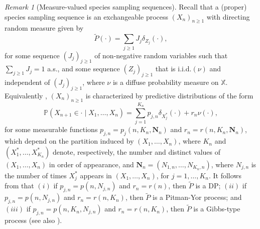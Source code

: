 \documentclass[a4paper]{article}
\theoremstyle{plain}
\theoremstyle{remark}
\newtheorem{remark}[theorem]{Remark}
\theoremstyle{definition}
\begin{document}
\begin{remark}[Measure-valued species sampling sequences]\label{model:mvps:remark_sss}
Recall that a (proper) species sampling sequence \citep[][Definition 12]{pitman1996} is an exchangeable process $(X_n)_{n\geq1}$ with directing random measure given by
\begin{equation}\label{model:mvps:remark_sss:eq1}
\tilde{P}(\cdot)=\sum_{j\geq1}J_j\delta_{Z_j}(\cdot),
\end{equation}
for some sequence $(J_j)_{j\geq1}$ of non-negative random variables such that $\sum_{j\geq1}J_j=1$ a.s., and some sequence $(Z_j)_{j\geq1}$ that is i.i.d.$(\nu)$ and independent of $(J_j)_{j\geq1}$, where $\nu$ is a diffuse probability measure on $\mathbb{X}$. Equivalently \citep{hansen2000}, $(X_n)_{n\geq1}$ is characterized by predictive distributions of the form
\begin{equation}\label{model:mvps:remark_sss:eq2}
\mathbb{P}(X_{n+1}\in\cdot\mid X_1,\ldots,X_n)=\sum_{j=1}^{K_n}p_{j,n}\delta_{X_j^*}(\cdot)+r_n\nu(\cdot),
\end{equation}
for some measurable functions $p_{j,n}=p_j(n,K_n,\textbf{N}_n)$ and $r_n=r(n,K_n,\textbf{N}_n)$, which depend on the partition induced by $(X_1,\ldots,X_n)$, where $K_n$ and $(X_1^*,\ldots,X_{K_n}^*)$ denote, respectively, the number and distinct values of $(X_1,\ldots,X_n)$ in order of appearance, and $\textbf{N}_n=(N_{1,n},\ldots,N_{K_n,n})$, where $N_{j,n}$ is the number of times $X_j^*$ appears in $(X_1,\ldots,X_n)$, for $j=1,\ldots,K_n$. It follows from \cite{bacallado2017} that $(i)$ if $p_{j,n}=p(n,N_{j,n})$ and $r_n=r(n)$, then $\tilde{P}$ is a DP; $(ii)$ if $p_{j,n}=p(n,N_{j,n})$ and $r_n=r(n,K_n)$, then $\tilde{P}$ is a Pitman-Yor process; and $(iii)$ if $p_{j,n}=p(n,K_n,N_{j,n})$ and $r_n=r(n,K_n)$, then $\tilde{P}$ is a Gibbs-type process (see also \citet[][Proposition 1]{deblasi2015}).


\end{remark}
\end{document}
